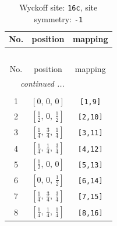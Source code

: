 \documentclass[fleqn,8pt]{jsarticle}
\begin{document}
\renewcommand{\arraystretch}{1.2}
\begin{longtable}{ccc}
\caption{Wyckoff site: {\tt 16c}, site symmetry: {\tt -1}}
 \\
 \hline \hline
No. & position & mapping \\ \hline \endfirsthead

\multicolumn{2}{l}{\tablename\ \thetable{}} \\
 \hline \hline
No. & position & mapping \\ \hline \endhead

 \hline \hline
\multicolumn{2}{r}{\footnotesize\it continued ...} \\ \endfoot

 \hline \hline
\multicolumn{2}{r}{} \\ \endlastfoot

1 & $\left[ 0,\, 0,\, 0 \right]$ & {\tt [1,9]} \\ \hline
2 & $\left[ \frac{1}{2},\, 0,\, \frac{1}{2} \right]$ & {\tt [2,10]} \\ \hline
3 & $\left[ \frac{1}{4},\, \frac{3}{4},\, \frac{1}{4} \right]$ & {\tt [3,11]} \\ \hline
4 & $\left[ \frac{1}{4},\, \frac{1}{4},\, \frac{3}{4} \right]$ & {\tt [4,12]} \\ \hline
5 & $\left[ \frac{1}{2},\, 0,\, 0 \right]$ & {\tt [5,13]} \\ \hline
6 & $\left[ 0,\, 0,\, \frac{1}{2} \right]$ & {\tt [6,14]} \\ \hline
7 & $\left[ \frac{1}{4},\, \frac{3}{4},\, \frac{3}{4} \right]$ & {\tt [7,15]} \\ \hline
8 & $\left[ \frac{1}{4},\, \frac{1}{4},\, \frac{1}{4} \right]$ & {\tt [8,16]} \\
\end{longtable}
\renewcommand{\arraystretch}{1.2}
\end{document}
